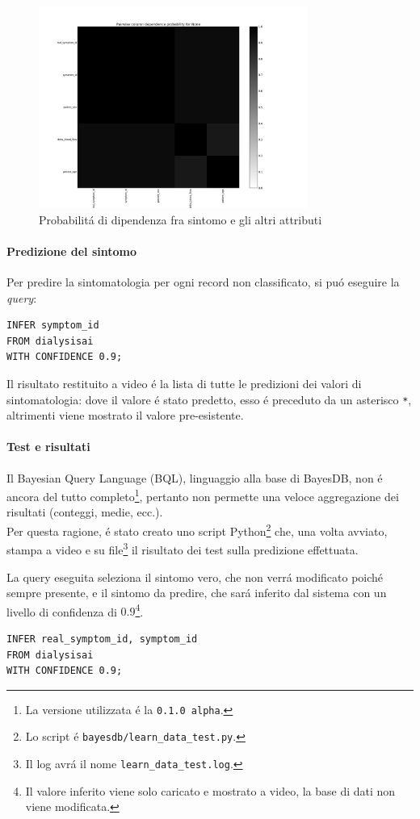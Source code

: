 \documentclass[preprint]{acm_proc_article-sp}
\begin{document}
\begin{figure}[!htb]
\centering
\includegraphics[width=250pt]{../bayesdb/dialysis_prob_dependencies_symptom.png}
\caption{Probabilit\'a di dipendenza fra sintomo e gli altri attributi}
\label{fig:bayesdb-dep-prob2}
\end{figure}

\paragraph{Predizione del sintomo}
Per predire la sintomatologia per ogni record non classificato, si pu\'o eseguire la \textit{query}:
\begin{verbatim}
INFER symptom_id
FROM dialysisai
WITH CONFIDENCE 0.9;
\end{verbatim}

Il risultato restituito a video \'e la lista di tutte le predizioni dei valori di sintomatologia: dove il valore \'e stato predetto, esso \'e preceduto da un asterisco \verb|*|, altrimenti viene mostrato il valore pre-esistente.

\paragraph{Test e risultati}
Il Bayesian Query Language (BQL), linguaggio alla base di BayesDB, non \'e ancora del tutto completo\footnote{La versione utilizzata \'e la \verb|0.1.0 alpha|.}, pertanto non permette una veloce aggregazione dei risultati (conteggi, medie, ecc.).\\
Per questa ragione, \'e stato creato uno script Python\footnote{Lo script \'e \verb|bayesdb/learn_data_test.py|.} che, una volta avviato, stampa a video e su file\footnote{Il log avr\'a il nome \verb|learn_data_test.log|.} il risultato dei test sulla predizione effettuata.

La query eseguita seleziona il sintomo vero, che non verr\'a modificato poich\'e sempre presente, e il sintomo da predire, che sar\'a inferito dal sistema con un livello di confidenza di $0.9$\footnote{Il valore inferito viene solo caricato e mostrato a video, la base di dati non viene modificata.}.
\begin{verbatim}
INFER real_symptom_id, symptom_id 
FROM dialysisai
WITH CONFIDENCE 0.9;
\end{verbatim}
\end{document}
